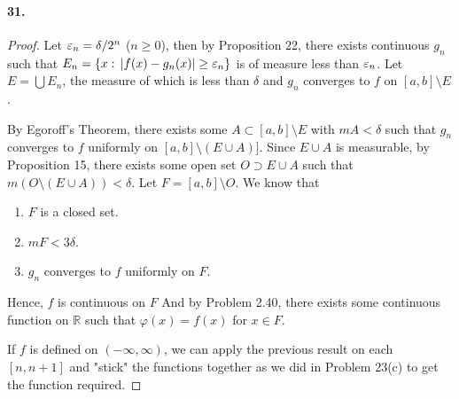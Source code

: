   \paragraph{31.}
  \begin{proof}
    Let $\varepsilon_n=\delta/2^n$ ($n\ge 0$), then by Proposition 22, there exists 
    continuous $g_n$ such that $E_n=\{x:\,|f(x)-g_n(x)|\ge\varepsilon_n\}$ is of 
    measure less than $\varepsilon_n$. Let $E=\bigcup E_n$, the measure of which is 
    less than $\delta$ and $g_n$ converges to $f$ on $[a,b]\setminus E$.\par
    By Egoroff's Theorem, there exists some $A\subset [a,b]\setminus E$ with $m
    A<\delta$ such that $g_n$ converges to $f$ uniformly on $[a,b]\setminus(E
    \cup A)]$. Since $E\cup A$ is measurable, by Proposition 15, there exists 
    some open set $O\supset E\cup A$ such that $m(O\setminus(E\cup A))<\delta$.
    Let $F=[a,b]\setminus O$. We know that 
    \begin{enumerate}
      \item $F$ is a closed set.
      \item $mF < 3\delta$.
      \item $g_n$ converges to $f$ uniformly on $F$.
    \end{enumerate}
    Hence, $f$ is continuous on $F$ And by Problem 2.40, there exists some 
    continuous function on $\mathbb{R}$ such that $\varphi(x) = f(x)$ for $x\in
    F$.\par
    If $f$ is defined on $(-\infty,\infty)$, we can apply the previous result on
    each $[n,n+1]$ and "stick" the functions together as we did in Problem 23(c)
    to get the function required.
  \end{proof}
